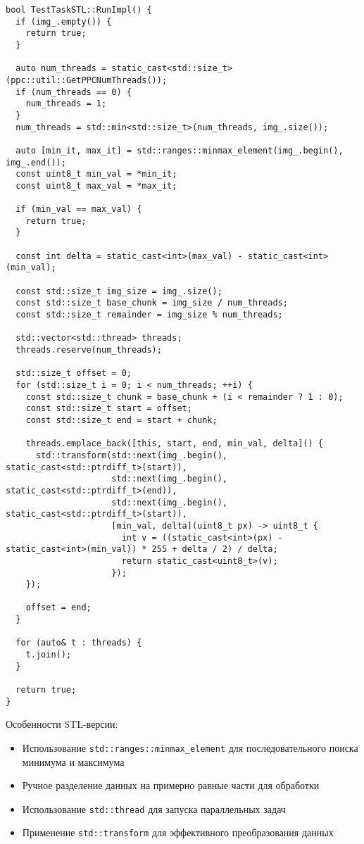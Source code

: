 \documentclass[a4paper,14pt]{article}
\begin{document}
\begin{lstlisting}[caption=Реализация с использованием STL и потоков]
bool TestTaskSTL::RunImpl() {
  if (img_.empty()) {
    return true;
  }

  auto num_threads = static_cast<std::size_t>(ppc::util::GetPPCNumThreads());
  if (num_threads == 0) {
    num_threads = 1;
  }
  num_threads = std::min<std::size_t>(num_threads, img_.size());

  auto [min_it, max_it] = std::ranges::minmax_element(img_.begin(), img_.end());
  const uint8_t min_val = *min_it;
  const uint8_t max_val = *max_it;

  if (min_val == max_val) {
    return true;
  }

  const int delta = static_cast<int>(max_val) - static_cast<int>(min_val);

  const std::size_t img_size = img_.size();
  const std::size_t base_chunk = img_size / num_threads;
  const std::size_t remainder = img_size % num_threads;

  std::vector<std::thread> threads;
  threads.reserve(num_threads);

  std::size_t offset = 0;
  for (std::size_t i = 0; i < num_threads; ++i) {
    const std::size_t chunk = base_chunk + (i < remainder ? 1 : 0);
    const std::size_t start = offset;
    const std::size_t end = start + chunk;

    threads.emplace_back([this, start, end, min_val, delta]() {
      std::transform(std::next(img_.begin(), static_cast<std::ptrdiff_t>(start)),
                     std::next(img_.begin(), static_cast<std::ptrdiff_t>(end)),
                     std::next(img_.begin(), static_cast<std::ptrdiff_t>(start)),
                     [min_val, delta](uint8_t px) -> uint8_t {
                       int v = ((static_cast<int>(px) - static_cast<int>(min_val)) * 255 + delta / 2) / delta;
                       return static_cast<uint8_t>(v);
                     });
    });

    offset = end;
  }

  for (auto& t : threads) {
    t.join();
  }

  return true;
}
\end{lstlisting}

Особенности STL-версии:
\begin{itemize}
    \item Использование \texttt{std::ranges::minmax\_element} для последовательного поиска минимума и максимума
    \item Ручное разделение данных на примерно равные части для обработки
    \item Использование \texttt{std::thread} для запуска параллельных задач
    \item Применение \texttt{std::transform} для эффективного преобразования данных
\end{itemize}
\end{document}
